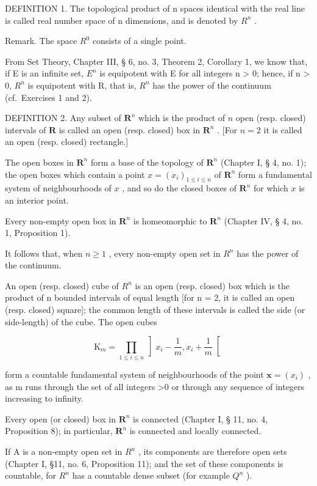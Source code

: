 DEFINITION 1. The topological product of n spaces identical with the real line is called real number space of n dimensions, and is denoted by \(R^{n}\) .

Remark. The space \(R^{0}\) consists of a single point.

From Set Theory, Chapter III, § 6, no. 3, Theorem 2, Corollary 1, we know that, if E is an infinite set, \(E^{n}\) is equipotent with E for all integers n \textgreater{} 0; hence, if n \textgreater{} 0, \(R^{n}\) is equipotent with R, that is, \(R^{n}\) has the power of the continuum (cf.~Exercises 1 and 2).

DEFINITION 2. Any subset of \(\mathbf{R}^n\) which is the product of \(n\) open (resp. closed) intervals of \(\mathbf{R}\) is called an open (resp. closed) box in \(\mathbf{R}^n\) . {[}For \(n = 2\) it is called an open (resp. closed) rectangle.{]}

The open boxes in \(\mathbf{R}^n\) form a base of the topology of \(\mathbf{R}^n\) (Chapter I, § 4, no. 1); the open boxes which contain a point \(x = (x_i)_{1 \leqslant i \leqslant n}\) of \(\mathbf{R}^n\) form a fundamental system of neighbourhoods of \(x\) , and so do the closed boxes of \(\mathbf{R}^n\) for which \(x\) is an interior point.

Every non-empty open box in \(\mathbf{R}^n\) is homeomorphic to \(\mathbf{R}^n\) (Chapter IV, § 4, no. 1, Proposition 1).

It follows that, when \(n \geqslant 1\) , every non-empty open set in \(R^{n}\) has the power of the continuum.

An open (resp. closed) cube of \(R^{n}\) is an open (resp. closed) box which is the product of n bounded intervals of equal length {[}for n = 2, it is called an open (resp. closed) square{]}; the common length of these intervals is called the side (or side-length) of the cube. The open cubes

\[
\mathrm{K} _ {m} = \prod_ {1 \leqslant i \leqslant n} \left] x _ {i} - \frac {1}{m}, x _ {i} + \frac {1}{m} \right[
\]

form a countable fundamental system of neighbourhoods of the point \(\boldsymbol{x} = (x_{i})\) , as m runs through the set of all integers \textgreater0 or through any sequence of integers increasing to infinity.

Every open (or closed) box in \(\mathbf{R}^n\) is connected (Chapter I, § 11, no. 4, Proposition 8); in particular, \(\mathbf{R}^n\) is connected and locally connected.

If A is a non-empty open set in \(R^{n}\) , its components are therefore open sets (Chapter I, §11, no. 6, Proposition 11); and the set of these components is countable, for \(R^{n}\) has a countable dense subset (for example \(Q^{n}\) ).

